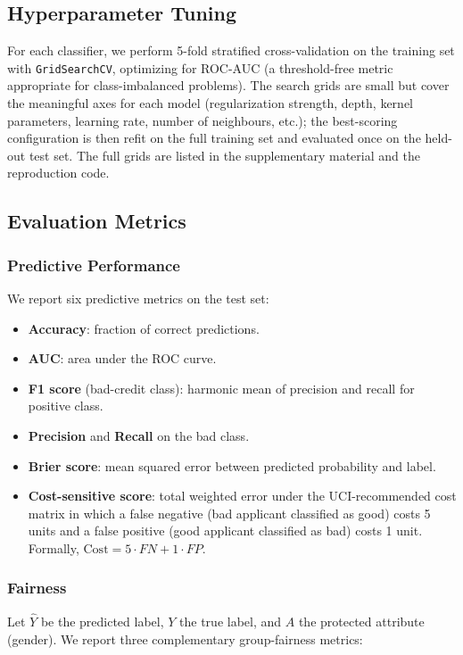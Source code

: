 \documentclass[conference]{IEEEtran}
\begin{document}
\subsection{Hyperparameter Tuning}
For each classifier, we perform 5-fold stratified cross-validation on the training set with \texttt{GridSearchCV}, optimizing for ROC-AUC (a threshold-free metric appropriate for class-imbalanced problems). The search grids are small but cover the meaningful axes for each model (regularization strength, depth, kernel parameters, learning rate, number of neighbours, etc.); the best-scoring configuration is then refit on the full training set and evaluated once on the held-out test set. The full grids are listed in the supplementary material and the reproduction code.

\subsection{Evaluation Metrics}

\subsubsection{Predictive Performance}
We report six predictive metrics on the test set:
\begin{itemize}
    \item \textbf{Accuracy}: fraction of correct predictions.
    \item \textbf{AUC}: area under the ROC curve.
    \item \textbf{F1 score} (bad-credit class): harmonic mean of precision and recall for positive class.
    \item \textbf{Precision} and \textbf{Recall} on the bad class.
    \item \textbf{Brier score}: mean squared error between predicted probability and label.
    \item \textbf{Cost-sensitive score}: total weighted error under the UCI-recommended cost matrix in which a false negative (bad applicant classified as good) costs 5 units and a false positive (good applicant classified as bad) costs 1 unit. Formally, $\mathrm{Cost} = 5 \cdot FN + 1 \cdot FP$.
\end{itemize}

\subsubsection{Fairness}
Let $\hat{Y}$ be the predicted label, $Y$ the true label, and $A$ the protected attribute (gender). We report three complementary group-fairness metrics:
\end{document}
